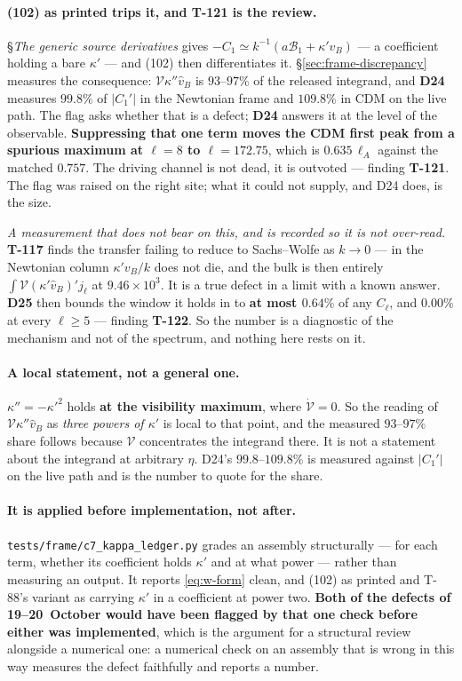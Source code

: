 \paragraph{(102) as printed trips it, and \textbf{T-121} is the review.}
\S\emph{The generic source derivatives} gives
$-C_1\simeq k^{-1}(a\mathcal B_1+\kappa'v_B)$ --- a coefficient holding a bare
$\kappa'$ --- and (102) then differentiates it.
\S\ref{sec:frame-discrepancy} measures the consequence:
$\mathcal V\kappa''\hat v_B$ is $93$--$97\%$ of the released integrand, and
\textbf{D24} measures $99.8\%$ of $|C_1'|$ in the Newtonian frame and
$109.8\%$ in CDM on the live path. The flag asks whether that is a defect;
\textbf{D24} answers it at the level of the observable. \textbf{Suppressing
that one term moves the CDM first peak from a spurious maximum at $\ell=8$ to
$\ell=172.75$}, which is $0.635\,\ell_A$ against the matched $0.757$. The
driving channel is not dead, it is outvoted --- finding \textbf{T-121}. The
flag was raised on the right site; what it could not supply, and D24 does, is
the size.

\emph{A measurement that does not bear on this, and is recorded so it is not
over-read.} \textbf{T-117} finds the transfer failing to reduce to
Sachs--Wolfe as $k\to0$ --- in the Newtonian column $\kappa'v_B/k$ does not
die, and the bulk is then entirely $\int\mathcal V(\kappa'\hat v_B)'j_\ell$
at $9.46\times10^3$. It is a true defect in a limit with a known answer.
\textbf{D25} then bounds the window it holds in to \textbf{at most $0.64\%$}
of any $C_\ell$, and $0.00\%$ at every $\ell\ge5$ --- finding \textbf{T-122}.
So the number is a diagnostic of the mechanism and not of the spectrum, and
nothing here rests on it.

\paragraph{A local statement, not a general one.} $\kappa''=-\kappa'^2$ holds
\textbf{at the visibility maximum}, where $\dot{\mathcal V}=0$. So the reading
of $\mathcal V\kappa''\hat v_B$ as \emph{three powers of $\kappa'$} is local to
that point, and the measured $93$--$97\%$ share follows because $\mathcal V$
concentrates the integrand there. It is not a statement about the integrand at
arbitrary $\eta$. D24's $99.8$--$109.8\%$ is measured against $|C_1'|$ on the
live path and is the number to quote for the share.

\paragraph{It is applied before implementation, not after.}
\texttt{tests/frame/c7\_kappa\_ledger.py} grades an assembly structurally ---
for each term, whether its coefficient holds $\kappa'$ and at what power ---
rather than measuring an output. It reports \eqref{eq:w-form} clean, and (102)
as printed and T-88's variant as carrying $\kappa'$ in a coefficient at power
two. \textbf{Both of the defects of 19--20~October would have been flagged by
that one check before either was implemented}, which is the argument for a
structural review alongside a numerical one: a numerical check on an assembly
that is wrong in this way measures the defect faithfully and reports a number.

